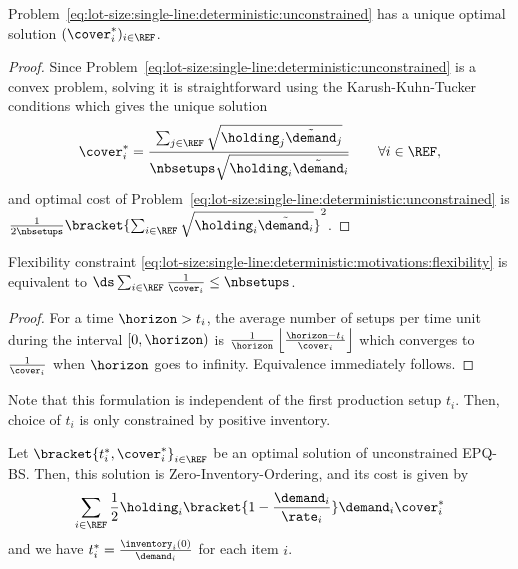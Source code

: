 \begin{lem}\label{lem:lot-size:single-line:deterministic:unconstrained:optimality}
Problem~\eqref{eq:lot-size:single-line:deterministic:unconstrained} has a unique optimal solution $(\cover_i^*)_{i\in\REF}$.
\end{lem}


\begin{proof}
Since Problem~\eqref{eq:lot-size:single-line:deterministic:unconstrained} is a convex problem, solving it is straightforward using the Karush-Kuhn-Tucker conditions which gives the unique solution
\begin{equation}
  \cover_i^*= \frac{\sum_{j\in\REF}\sqrt{\holding_j\tilde{\demand}_j}}{\nbsetups\sqrt{\holding_i\tilde{\demand}_i}}\qquad\forall i\in\REF,
\end{equation}
and optimal cost of Problem~\eqref{eq:lot-size:single-line:deterministic:unconstrained} is $\frac{1}{2\nbsetups}\bracket{\sum_{i\in\REF}\sqrt{\holding_i\tilde{\demand_i}}}^2$.
\end{proof}



\begin{lem}\label{lem:lot-size:single-line:models:average-setup}
Flexibility constraint \eqref{eq:lot-size:single-line:deterministic:motivations:flexibility} is equivalent to
$\ds\sum_{i\in\REF} \frac{1}{\cover_i} \le \nbsetups$.
\end{lem}


\begin{proof}
For a time $\horizon>t_i$, the average number of setups per time unit during the interval $[0,\horizon)$ is
$\frac{1}{\horizon}\left\lfloor\frac{\horizon-t_i}{\cover_i}\right\rfloor$
which converges to $\frac{1}{\cover_i}$ when $\horizon$ goes to infinity.
Equivalence immediately follows.
\end{proof}


Note that this formulation is independent of the first production setup $t_i$.
Then, choice of $t_i$ is only constrained by positive inventory.


\begin{lem}\label{lem:lot-size:single-line:models:ZIO}
Let $\bracket{t_i^*,\cover_i^*}_{i\in\REF}$ be an optimal solution of unconstrained EPQ-BS.
Then, this solution is Zero-Inventory-Ordering, and its cost is given by
\begin{equation}
  \sum_{i\in\REF}\frac{1}{2}\holding_i\bracket{1-\frac{\demand_i}{\rate_i}}\demand_i\cover_i^*
\end{equation}
and we have $t_i^*=\frac{\inventory_i(0)}{\demand_i}$ for each item $i$.
\end{lem}



